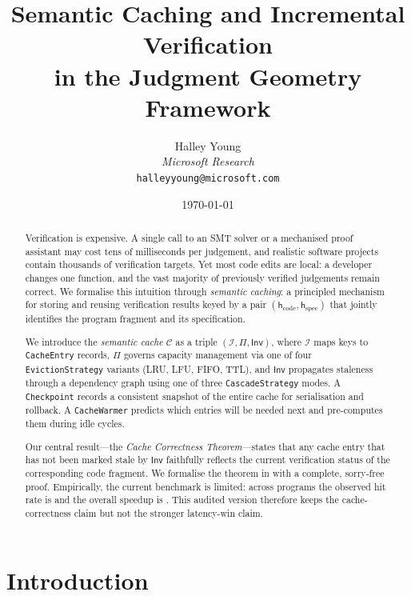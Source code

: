 \documentclass[11pt]{article}
\title{\textbf{Semantic Caching and Incremental Verification\\
       in the Judgment Geometry Framework}}
\author{%
  Halley Young\\
  \textit{Microsoft Research}\\
  \texttt{halleyyoung@microsoft.com}
}
\date{\today}
\newcommand{\Cache}{\mathcal{C}}                   %
\newcommand{\CodeHash}{\mathsf{h}_{\mathrm{code}}} %
\newcommand{\SpecHash}{\mathsf{h}_{\mathrm{spec}}} %
\newcommand{\CacheIndex}{\mathcal{I}}              %
\newcommand{\CachePol}{\Pi}                        %
\newcommand{\CacheInval}{\mathsf{Inv}}             %
\newcommand{\LRU}{\textsc{LRU}}                    %
\newcommand{\LFU}{\textsc{LFU}}                    %
\newcommand{\FIFO}{\textsc{FIFO}}                  %
\newcommand{\TTL}{\textsc{TTL}}                    %
\begin{document}
\maketitle

\begin{abstract}
Verification is expensive.  A single call to an SMT solver or a
mechanised proof assistant may cost tens of milliseconds per judgement,
and realistic software projects contain thousands of verification
targets.  Yet most code edits are local: a developer changes one
function, and the vast majority of previously verified judgements remain
correct.  We formalise this intuition through \emph{semantic caching}:
a principled mechanism for storing and reusing verification results
keyed by a pair $(\CodeHash, \SpecHash)$ that jointly identifies the
program fragment and its specification.

We introduce the \emph{semantic cache} $\Cache$ as a triple
$({\CacheIndex}, \CachePol, \CacheInval)$, where $\CacheIndex$ maps
keys to \texttt{CacheEntry} records, $\CachePol$ governs capacity
management via one of four \texttt{EvictionStrategy} variants
(\LRU, \LFU, \FIFO, \TTL), and $\CacheInval$ propagates staleness
through a dependency graph using one of three
\texttt{CascadeStrategy} modes.  A \texttt{Checkpoint} records a
consistent snapshot of the entire cache for serialisation and rollback.
A \texttt{CacheWarmer} predicts which entries will be needed next and
pre-computes them during idle cycles.

Our central result---the \emph{Cache Correctness Theorem}---states that
any cache entry that has not been marked stale by $\CacheInval$
faithfully reflects the current verification status of the
corresponding code fragment.  We formalise the theorem in \LEAN{} with
a complete, sorry-free proof.  Empirically, the current benchmark is
limited: across \ppXXXVIIITotalPrograms{} programs the observed hit rate
is \ppXXXVIIIHitRate{} and the overall speedup is
\ppXXXVIIISpeedup.  This audited version therefore keeps the
cache-correctness claim but not the stronger latency-win claim.
\end{abstract}

\newpage

\section{Introduction}\label{sec:intro}
\end{document}
